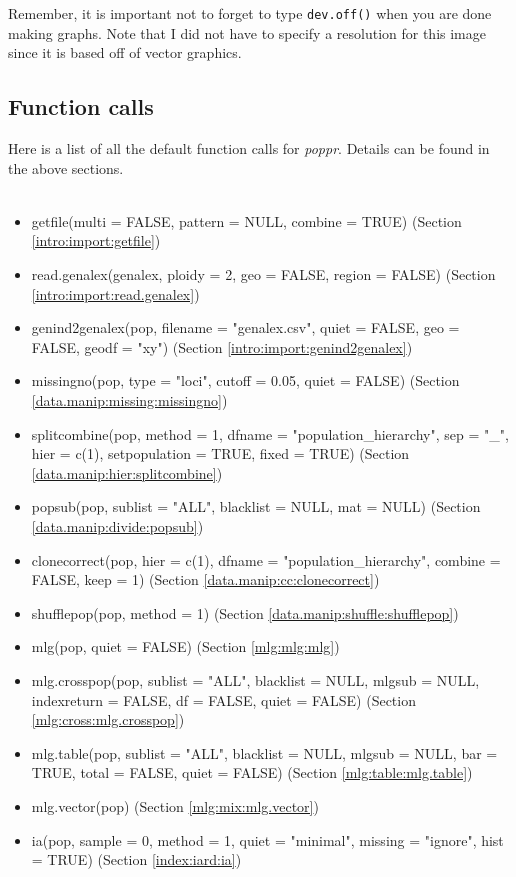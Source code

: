 \documentclass[letterpaper]{article}
\newcommand{\tab}{\hspace*{1em}}
\begin{document}
Remember, it is important not to forget to type \texttt{dev.off()} when you are done making graphs. Note that I did not have to specify a resolution for this image since it is based off of vector graphics.

\subsection{Function calls}\label{appendix:funk}

\tab\tab Here is a list of all the default function calls for \textit{poppr}. Details can be found in the above sections.\\
\tt \small
\begin{itemize}
\item getfile(multi = FALSE, pattern = NULL, combine = TRUE) (Section \ref{intro:import:getfile})
\item read.genalex(genalex, ploidy = 2, geo = FALSE, region = FALSE) (Section \ref{intro:import:read.genalex}) 
\item genind2genalex(pop, filename = "genalex.csv", quiet = FALSE, geo = FALSE, geodf = "xy") (Section \ref{intro:import:genind2genalex})
\item missingno(pop, type = "loci", cutoff = 0.05, quiet = FALSE) (Section \ref{data.manip:missing:missingno})
\item splitcombine(pop, method = 1, dfname = "population\_hierarchy", sep = "\_", hier = c(1), setpopulation = TRUE, fixed = TRUE) (Section \ref{data.manip:hier:splitcombine})
\item popsub(pop, sublist = "ALL", blacklist = NULL, mat = NULL) (Section \ref{data.manip:divide:popsub})
\item clonecorrect(pop, hier = c(1), dfname = "population\_hierarchy", combine = FALSE, keep = 1) (Section \ref{data.manip:cc:clonecorrect})
\item shufflepop(pop, method = 1) (Section \ref{data.manip:shuffle:shufflepop})
\item mlg(pop, quiet = FALSE) (Section \ref{mlg:mlg:mlg})
\item mlg.crosspop(pop, sublist = "ALL", blacklist = NULL, mlgsub = NULL, indexreturn = FALSE, df = FALSE, quiet = FALSE) (Section \ref{mlg:cross:mlg.crosspop})
\item mlg.table(pop, sublist = "ALL", blacklist = NULL, mlgsub = NULL, bar = TRUE, total = FALSE, quiet = FALSE) (Section \ref{mlg:table:mlg.table})
\item mlg.vector(pop) (Section \ref{mlg:mix:mlg.vector})
\item ia(pop, sample = 0, method = 1, quiet = "minimal", missing = "ignore", hist = TRUE) (Section \ref{index:iard:ia})

\end{itemize}
\end{document}
